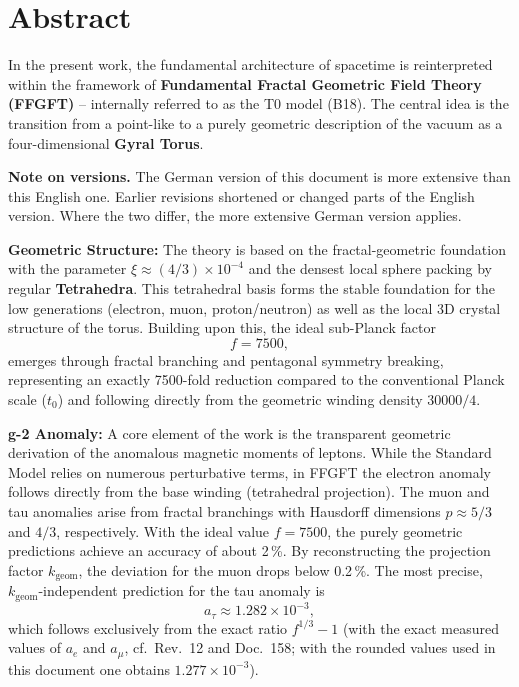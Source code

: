 \section*{Abstract}
		In the present work, the fundamental architecture of spacetime is reinterpreted within the framework of \textbf{Fundamental Fractal Geometric Field Theory (FFGFT)} – internally referred to as the T0 model (B18). The central idea is the transition from a point-like to a purely geometric description of the vacuum as a four-dimensional \textbf{Gyral Torus}.

	\medskip\noindent\textbf{Note on versions.} The German version of this document is more extensive than this English one. Earlier revisions shortened or changed parts of the English version. Where the two differ, the more extensive German version applies.

		
		\textbf{Geometric Structure:} The theory is based on the fractal-geometric foundation with the parameter $\xi \approx (4/3)\times 10^{-4}$ and the densest local sphere packing by regular \textbf{Tetrahedra}. This tetrahedral basis forms the stable foundation for the low generations (electron, muon, proton/neutron) as well as the local 3D crystal structure of the torus. Building upon this, the ideal sub-Planck factor
		\begin{equation*}
			f = 7500,
		\end{equation*}
		emerges through fractal branching and pentagonal symmetry breaking, representing an exactly 7500-fold reduction compared to the conventional Planck scale ($t_0$) and following directly from the geometric winding density $30000/4$.
		
		\textbf{g-2 Anomaly:} A core element of the work is the transparent geometric derivation of the anomalous magnetic moments of leptons. While the Standard Model relies on numerous perturbative terms, in FFGFT the electron anomaly follows directly from the base winding (tetrahedral projection). The muon and tau anomalies arise from fractal branchings with Hausdorff dimensions $p \approx 5/3$ and $4/3$, respectively. With the ideal value $f = 7500$, the purely geometric predictions achieve an accuracy of about 2\,\%. By reconstructing the projection factor $k_\text{geom}$, the deviation for the muon drops below 0.2\,\%. The most precise, $k_\text{geom}$-independent prediction for the tau anomaly is
		\begin{equation*}
			a_\tau \approx 1.282 \times 10^{-3},
		\end{equation*}
		which follows exclusively from the exact ratio $f^{1/3} - 1$ (with the exact measured values of $a_e$ and $a_\mu$, cf.\ Rev.~12 and Doc.~158; with the rounded values used in this document one obtains $1.277 \times 10^{-3}$).
		

